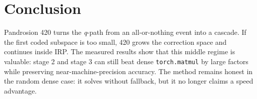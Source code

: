 \documentclass[11pt]{article}
\newcommand{\qpath}{\textit{q}\nobreakdash-path}
\newcommand{\matmul}{\texttt{torch.matmul}}
\begin{document}
\section{Conclusion}

Pandrosion 420 turns the \qpath{} from an all-or-nothing event into a cascade.
If the first coded subspace is too small, 420 grows the correction space and
continues inside IRP.  The measured results show that this middle regime is
valuable: stage 2 and stage 3 can still beat dense \matmul{} by large factors
while preserving near-machine-precision accuracy.  The method remains honest in
the random dense case: it solves without fallback, but it no longer claims a
speed advantage.
\end{document}
